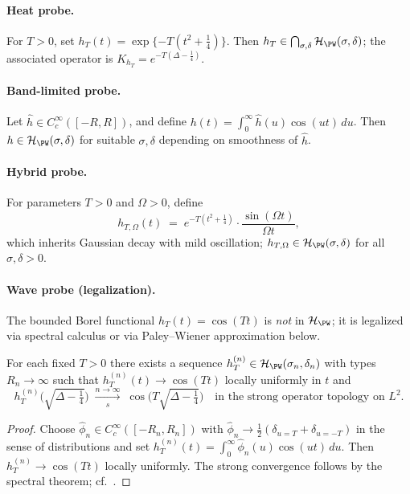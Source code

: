 \paragraph{Heat probe.} For $T>0$, set $h_T(t)=\exp\{-T(t^2+\tfrac14)\}$. Then $h_T\in \bigcap_{\sigma,\delta}\mathcal{H}_{\PW}(\sigma,\delta)$; the associated operator is $K_{h_T}=e^{-T(\Delta-\tfrac14)}$. %

\paragraph{Band-limited probe.} Let $\widehat{h}\in C_c^\infty([-R,R])$, and define $h(t)=\int_0^\infty \widehat{h}(u)\cos(ut)\,du$. Then $h\in\mathcal{H}_{\PW}(\sigma,\delta)$ for suitable $\sigma,\delta$ depending on smoothness of $\widehat{h}$. %

\paragraph{Hybrid probe.} For parameters $T>0$ and $\Omega>0$, define
\[
  h_{T,\Omega}(t) \;=\; e^{-T(t^2+\tfrac14)} \cdot \frac{\sin(\Omega t)}{\Omega t},
\]
which inherits Gaussian decay with mild oscillation; $h_{T,\Omega}\in\mathcal{H}_{\PW}(\sigma,\delta)$ for all $\sigma,\delta>0$. %

\paragraph{Wave probe (legalization).} The bounded Borel functional $h_T(t)=\cos(Tt)$ is \emph{not} in $\mathcal{H}_{\PW}$; it is legalized via spectral calculus or via Paley–Wiener approximation below. %

\begin{lemma} \label{lem:wave-approx} %
For each fixed $T>0$ there exists a sequence $h_T^{(n)}\in\mathcal{H}_{\PW}(\sigma_n,\delta_n)$ with types $R_n\to\infty$ such that $h_T^{(n)}(t)\to \cos(Tt)$ locally uniformly in $t$ and
\[
  h_T^{(n)}\!\big(\sqrt{\Delta-\tfrac14}\big) \;\xrightarrow[s]{n\to\infty}\; \cos\!\big(T\sqrt{\Delta-\tfrac14}\big)
  \quad \text{in the strong operator topology on } L^2. %
\]
\end{lemma}

\begin{proof}
Choose $\widehat{\phi}_n\in C_c^\infty([-R_n,R_n])$ with $\widehat{\phi}_n\to \tfrac12(\delta_{u=T}+\delta_{u=-T})$ in the sense of distributions and set $h_T^{(n)}(t)=\int_0^\infty \widehat{\phi}_n(u)\cos(ut)\,du$. Then $h_T^{(n)}\to \cos(Tt)$ locally uniformly. The strong convergence follows by the spectral theorem; cf.\ \cite[§7.9]{ReedSimonI}. %
\end{proof}

